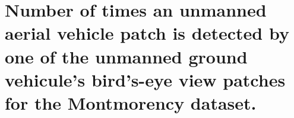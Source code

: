 \chapter{Number of times an unmanned aerial vehicle patch is detected by one of the unmanned ground vehicule's bird's-eye view patches for the Montmorency dataset.}\label{ch:full_patch_detection_montmorency}
\begin{table}[ht!]
    \centering
    \caption{Number of times a \gls{uav} patch is detected by either of the \gls{ugv} \gls{bev} patches.
    Each row corresponds to one node. The first 10 columns indicate the number of times each patch is detected.
    The last column shows the ratio of patches detected at least once to the total number of patches in the node.}
    \label{tab:appendix:full_patch_detection_montmorency}
\end{table}


